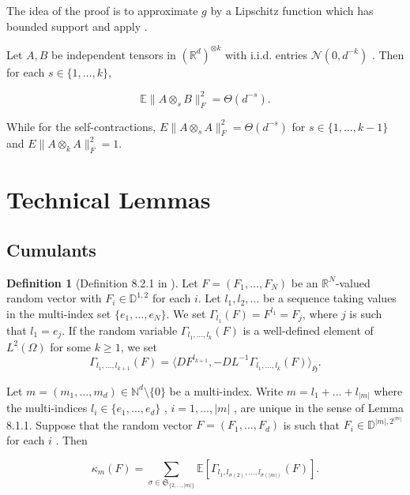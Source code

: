 \documentclass[]{article}
\makeatletter
\numberwithin{equation}{section}
\theoremstyle{definition}
\newtheorem{definition}{Definition}[section]
\renewenvironment{proof}[1][\proofname]{\par
  \pushQED{\qed}%
  \normalfont \topsep6\p@\@plus6\p@\relax
  \trivlist
  \item[\hskip\labelsep\textbf{#1.}]\ignorespaces
}{%
  \popQED\endtrivlist\@endpefalse
}
\newcommand{\EE}{\mathbb{E}}
\makeatother
\begin{document}
\begin{proof}[Sketch of the Proof]
The idea of the proof is to approximate $g$ by a Lipschitz function which has bounded support and apply .
\end{proof}


\begin{lemma}
Let $A, B$ be independent tensors in $(\mathbb{R}^d)^{\otimes k}$ with i.i.d. entries $\mathcal{N}(0, d^{-k})$ . Then for each $s \in \{1, \dots, k\}$,

$$
\mathbb{E}\|A \otimes_s B\|_F^2 = \Theta(d^{-s}).
$$

While for the self-contractions, $E\|A \otimes_s A\|_F^2 = \Theta(d^{-s})$ for $s \in \{1, \dots, k-1\}$ and $E\|A \otimes_k A\|_F^2 = 1$.
\label{lemma:simple_self_and_cross_contractions}
\end{lemma}



\section{Technical Lemmas}

\subsection{Cumulants}

\begin{definition}[Definition 8.2.1 in \cite{nourdin2012normal}]
    Let $F = (F_1, \ldots, F_N)$ be an $\mathbb{R}^N$-valued random vector with $F_i \in \mathbb{D}^{1,2}$ for each $i$. 
    Let $l_1, l_2, \ldots$  be a sequence taking values in the multi-index set  $\{e_1, \ldots, e_N\}$. We set $\Gamma_{l_1}(F) = F^{l_1} = F_j$, where $j$  is such that $l_1 = e_j$. If the random variable $\Gamma_{l_1, \ldots, l_k}(F)$ is a well-defined element of $L^2(\Omega)$ for some $k \geq 1$,  we set
    $$
    \Gamma_{l_1, \ldots, l_{k+1}}(F) = \langle DF^{l_{k+1}}, -DL^{-1}\Gamma_{l_1, \ldots, l_k}(F) \rangle_{\mathfrak{H}}.
    $$
    \label{def:gamma_l_1_l_N}
\end{definition}


\begin{lemma}
Let $m = (m_1, \ldots, m_d) \in \mathbb{N}^d \setminus \{0\}$ be a multi-index. Write $m = l_1 + \ldots + l_{|m|}$ where the multi-indices $l_i \in \{e_1, \ldots, e_d\}$ , $i = 1, \ldots, |m|$ , are unique in the sense of Lemma 8.1.1. Suppose that the random vector $F = (F_1, \ldots, F_d)$ is such that $F_i \in \mathbb{D}^{|m|, 2^{|m|}}$ for each $i$ . Then

$$
\kappa_m(F) = \sum_{\sigma \in \mathfrak{S}_{\{2, \ldots, |m|\}}} \EE\left[\Gamma_{l_1, l_{\sigma(2)}, \ldots, l_{\sigma(|m|)}}(F)\right].
$$    
\label{lemma:cumulants_and_Gamma}
\end{lemma}
\end{document}
